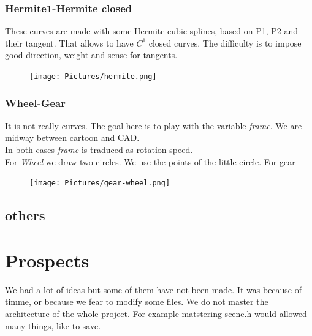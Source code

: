 \documentclass{article}
\begin{document}
\subsubsection*{Hermite1-Hermite closed}
These curves are made with some Hermite cubic splines, based on P1, P2 and their tangent. That allows to have $C^1$ closed curves. The difficulty is to impose good direction, weight and sense for tangents. %
\begin{figure}[H]
   \texttt{[image: Pictures/hermite.png]}
\end{figure}
\subsubsection*{Wheel-Gear}
It is not really curves. The goal here is to play with the variable \textit{frame}. We are midway between cartoon and CAD.\\
In both cases \textit{frame} is traduced as rotation speed. \\
For \textit{Wheel} we draw two circles. We use the points of the little circle.%
For gear %
\begin{figure}[H]
   \texttt{[image: Pictures/gear-wheel.png]}
\end{figure}

\subsection*{others} %
\section*{Prospects}
We had a lot of ideas but some of them have not been made. It was because of timme, or because we fear to modify some files. We do not master the architecture of the whole project. For example matstering scene.h would allowed many things, like to save. 
\end{document}
